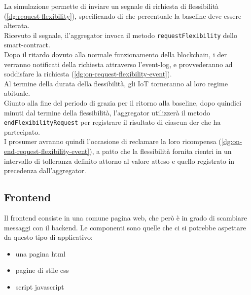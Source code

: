 

La simulazione permette di inviare un segnale di richiesta di flessibilità (\autoref{dg:request-flexibility}), specificando di che percentuale la baseline deve essere alterata. \\
Ricevuto il segnale, il'\gls{aggregator} invoca il metodo \texttt{requestFlexibility} dello \gls{smart-contract}. \\
Dopo il ritardo dovuto alla normale funzionamento della \gls{blockchain},
i \gls{der} verranno notificati della richiesta attraverso l'\gls{event-log},
e provvederanno ad soddisfare la richiesta (\autoref{dg:on-request-flexibility-event}). \\
Al termine della durata della flessibilità, gli IoT torneranno al loro regime abituale. \\
Giunto alla fine del periodo di grazia per il ritorno alla baseline, dopo quindici minuti dal termine della flessibilità,
l'\gls{aggregator} utilizzerà il metodo \texttt{endFlexibilityRequest} per registrare il risultato di ciascun \gls{der} che ha partecipato. \\
I \gls{prosumer} avranno quindi l'occasione di reclamare la loro ricompensa (\autoref{dg:on-end-request-flexibility-event}),
a patto che la flessibilità fornita rientri in un intervallo di tolleranza definito attorno al valore atteso e quello registrato in precedenza dall'\gls{aggregator}. \\



\subsection{Frontend}

Il frontend consiste in una comune pagina web, che però è in grado di scambiare messaggi con il backend.
Le componenti sono quelle che ci si potrebbe aspettare da questo tipo di applicativo:

\begin{itemize}
    \item una pagina html
    \item pagine di stile css
    \item script javascript
\end{itemize}

